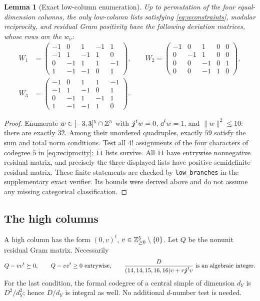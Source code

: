 \documentclass[11pt]{article}
\newtheorem{lemma}[theorem]{Lemma}
\theoremstyle{remark}\newtheorem{remark}[theorem]{Remark}
\begin{document}
\begin{lemma}[Exact low-column enumeration]\label{lem:lows}
Up to permutation of the four equal-dimension columns, the only low-column lists satisfying \eqref{eq:wconstraints}, modular reciprocity, and residual Gram positivity have the following deviation matrices, whose rows are the $w_\nu$:
\begin{align*}
W_1&=\begin{pmatrix}-1&0&1&-1&1\\-1&1&-1&1&0\\0&-1&1&1&-1\\1&-1&-1&0&1\end{pmatrix},\qquad
W_2=\begin{pmatrix}-1&0&1&0&0\\0&-1&1&0&0\\0&0&-1&0&1\\0&0&-1&1&0\end{pmatrix},\\
W_3&=\begin{pmatrix}-1&0&1&1&-1\\-1&1&-1&0&1\\0&-1&1&-1&1\\1&-1&-1&1&0\end{pmatrix}.
\end{align*}
\end{lemma}
\begin{proof}
Enumerate $w\in[-3,3]^5\cap\mathbb Z^5$ with $\boldsymbol{j}^tw=0$, $\dd^tw=1$, and $\|w\|^2\le10$: there are exactly $32$. Among their unordered quadruples, exactly $59$ satisfy the sum and total norm conditions. Test all $4!$ assignments of the four characters of codegree $5$ in \eqref{eq:reciprocity}; $11$ lists survive. All $11$ have entrywise nonnegative residual matrix, and precisely the three displayed lists have positive-semidefinite residual matrix. These finite statements are checked by \texttt{low\_branches} in the supplementary exact verifier. Its bounds were derived above and do not assume any missing categorical classification.
\end{proof}

\subsection{The high columns}
A high column has the form $(0,v)^t$, $v\in\mathbb Z_{\ge0}^5\setminus\{0\}$. Let $Q$ be the nonunit residual Gram matrix. Necessarily
\begin{equation}\label{eq:highconditions}
Q-vv^t\succeq0,\qquad Q-vv^t\ge0\text{ entrywise},\qquad
\frac{D}{(14,14,15,16,16)v+r\boldsymbol{j}^tv}\text{ is an algebraic integer}.
\end{equation}
For the last condition, the formal codegree of a central simple of dimension $d_Y$ is $D^2/d_Y^2$; hence $D/d_Y$ is integral as well. No additional $d$-number test is needed.
\end{document}
